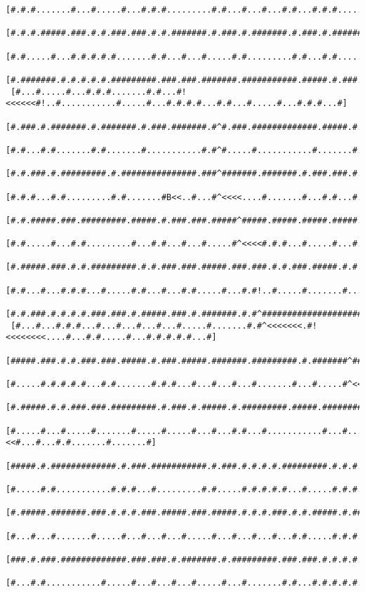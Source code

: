 \documentclass[a4paper,10pt,ngerman]{scrartcl}
\begin{document}
\begin{lstlisting}[frame=tb,basicstyle=\tiny\ttfamily]
 [#.#.#.......#...#.....#...#.#.#.........#.#...#...#...#.#...#.#.#.....#...#.....#.....#.#.......#...#]
 [#.#.#.#####.###.#.#.###.###.#.#.#######.#.###.#.#######.#.###.#.#######.#########.###.#.###.#####.###]
 [#.#.....#...#.#.#.#.#.......#.#...#...#.....#.#.........#.#...#.#.....#.........#.#...#.#.#.....#.#.#]
 [#.#######.#.#.#.#.#.#########.###.###.#######.###########.#####.#.###.#.#####.#.###.###.#.#####.#.#.#]
 [#...#.....#...#.#.#.......#.#...#!<<<<<<#!..#...........#.....#...#.#.#.#...#.#...#.....#...#.#.#...#]
 [#.###.#.#######.#.#######.#.###.#######.#^#.###.#############.#####.#.###.#.#.###.#.#####.#.#.#.###.#]
 [#.#...#.#.......#.#.......#...........#.#^#.....#...........#.......#.#...#.#...#.#.......#.#.#...#.#]
 [#.#.###.#.#########.#.###############.###^#######.#######.#.###.###.#.#.###.#####.#########.#.#.###.#]
 [#.#.#...#.#.........#.#.......#B<<..#...#^<<<<....#.......#...#.#...#.#.#...#.....#.......#.#.#.....#]
 [#.#.#####.###.#########.#####.#.###.###.#####^#####.#####.#####.#####.#.###.#.#####.#######.#.#######]
 [#.#.....#...#.#.........#...#.#...#...#.....#^<<<<#.#.#...#.....#...#.#...#...#...............#.....#]
 [#.#####.###.#.#.#########.#.#.###.###.#####.###.###.#.#.###.#####.#.#.###.#.#################.#.#####]
 [#.#...#...#.#.#...#.....#.#...#...#.#.....#...#.#!..#.....#.......#...#...#.#...............#.#.....#]
 [#.#.###.#.#.#.#.###.###.#.#####.###.#.#######.#.#^#####################.#####.###########.#.#.#.###.#]
 [#...#...#.#.#...#...#...#...#...#.....#.......#.#^<<<<<<<.#!<<<<<<<<....#...#.#.....#...#.#.#.#.#...#]
 [#####.###.#.#.###.###.#####.#.###.#####.#######.#########.#.#######^#####.#.#.#.#.###.#.#.#.#.###.#.#]
 [#.....#.#.#.#.#...#.#.......#.#.#...#...#...#...#.......#...#.....#^<<<<..#.#...#.#...#.#.#.#.....#.#]
 [#.#####.#.#.###.###.#########.#.###.#.#####.#.#########.#####.#############.#####.#.###.###.#######.#]
 [#.....#...#.....#.......#.....#.....#...#...#.#...#...........#...#...#!<<#...#...#.#.......#.......#]
 [#####.#.#############.#.###.###########.#.###.#.#.#.#.#########.#.#.#.#.#^###.#.###.#############.###]
 [#.....#.#...........#.#.#...#.........#.#.....#.#.#.#.#...#.....#.#.#...#^..#...#.#.....#.......#...#]
 [#.#####.#######.###.#.#.#.###.#####.###.#####.#.#.#.###.#.#.#####.#.#######.###.#.#####.#.#####.###.#]
 [#...#...#.......#.....#...#...#...#.....#...#...#...#...#.#.....#.#.#.....#...#.#.....#.....#...#...#]
 [###.#.###.#############.###.###.#.#######.#.#########.###.###.#.#.#.#.#######.#.###.#.#######.#######]
 [#...#.#...........#.....#...#...#...#.....#...#.......#.#...#.#.#.#.#.......#.#.#...#...#...#.......#]

\end{lstlisting}
\end{document}
